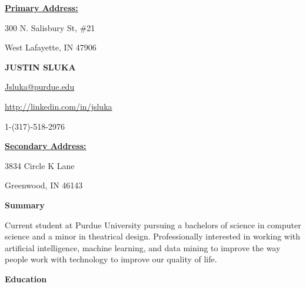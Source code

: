 \documentclass[11pt]{article}
\begin{document}
	\begin{center}
	\begin{minipage}{0.3\linewidth}
		\begin{flushleft}
		\underline{\textbf{Primary Address:}}
		\vspace{2mm}

		300 N. Salisbury St, \#21

		West Lafayette, IN 47906
		\end{flushleft}
	\end{minipage}
	\hfill
	\begin{minipage}{0.3\linewidth}
		\begin{center}
		\textbf{JUSTIN SLUKA}

		\href{mailto:jsluka@purdue.edu}{Jsluka@purdue.edu}

		\href{http://linkedin.com/in/jsluka}{http://linkedin.com/in/jsluka}

		1-(317)-518-2976
		\end{center}
	\end{minipage}
	\hfill
	\begin{minipage}{0.3\linewidth}
		\begin{flushright}
		\underline{\textbf{Secondary Address:}}
		\vspace{2mm}

		3834 Circle K Lane

		Greenwood, IN 46143
		\end{flushright}
	\end{minipage}
	\end{center}

	\begin{flushleft}
		\textbf{Summary}
		\hrulefill
	\end{flushleft}
	
	\begin{center}
	\begin{minipage}{0.95\linewidth}
	Current student at Purdue University pursuing a bachelors of science in computer science and a minor in theatrical design. Professionally interested in working with artificial intelligence, machine learning, and data mining to improve the way people work with technology to improve our quality of life. 
	\end{minipage}
	\end{center}


	\begin{flushleft}
		\textbf{Education}
		\hrulefill
	\end{flushleft}
	
\end{document}
